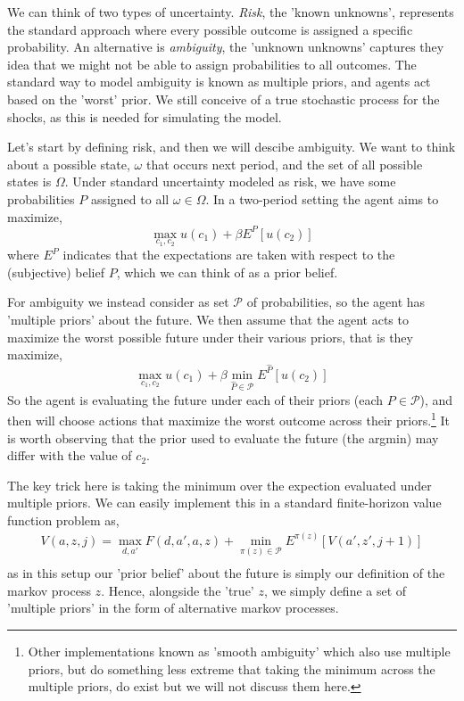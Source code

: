 \label{app:AmbiguityAversion}
We can think of two types of uncertainty. \textit{Risk}, the 'known unknowns', represents the standard approach where every possible outcome is assigned a specific probability. An alternative is \textit{ambiguity}, the 'unknown unknowns' captures they idea that we might not be able to assign probabilities to all outcomes. The standard way to model ambiguity is known as multiple priors, and agents act based on the 'worst' prior. We still conceive of a true stochastic process for the shocks, as this is needed for simulating the model.

Let's start by defining risk, and then we will descibe ambiguity. We want to think about a possible state, $\omega$ that occurs next period, and the set of all possible states is $\Omega$. Under standard uncertainty modeled as risk, we have some probabilities $P$ assigned to all $\omega \in \Omega$. In a two-period setting the agent aims to maximize,
\begin{equation*}
 \max_{c_1,c_2} u(c_1) + \beta E^P[u(c_2)]
\end{equation*}
where $E^P$ indicates that the expectations are taken with respect to the (subjective) belief $P$, which we can think of as a prior belief.

For ambiguity we instead consider as set $\mathcal{P}$ of probabilities, so the agent has 'multiple priors' about the future. We then assume that the agent acts to maximize the worst possible future under their various priors, that is they maximize,
\begin{equation*}
 \max_{c_1,c_2} u(c_1) + \beta \min_{\hat{P} \in \mathcal{P}} E^{\hat{P}}[u(c_2)]
\end{equation*}
So the agent is evaluating the future under each of their priors (each $P \in \mathcal{P}$), and then will choose actions that maximize the worst outcome across their priors.\footnote{Other implementations known as 'smooth ambiguity' which also use multiple priors, but do something less extreme that taking the minimum across the multiple priors, do exist but we will not discuss them here.} It is worth observing that the prior used to evaluate the future (the argmin) may differ with the value of $c_2$.

The key trick here is taking the minimum over the expection evaluated under multiple priors. We can easily implement this in a standard finite-horizon value function problem as,
\begin{eqnarray*}
 V(a,z,j) = \max_{d, a'} F(d,a',a,z)  + \min_{\pi(z) \in \mathcal{P}} E^{\pi(z)}[V(a',z',j+1)]  \\
\end{eqnarray*}
as in this setup our 'prior belief' about the future is simply our definition of the markov process $z$. Hence, alongside the 'true' $z$, we simply define a set of 'multiple priors' in the form of alternative markov processes.

